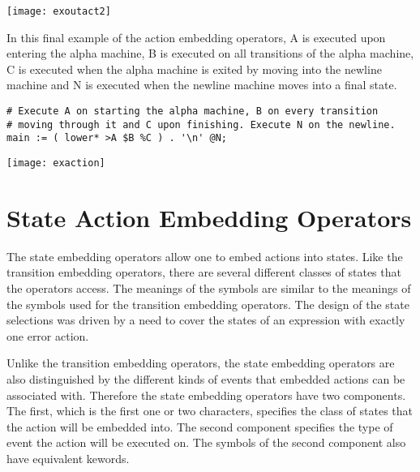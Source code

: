 \documentclass[letterpaper,11pt,oneside]{book}
\newcommand{\graphspace}{\vspace{10pt}}
\newenvironment{inline_code}{\def\baselinestretch{1}\vspace{12pt}\small}{}
\begin{document}
\graphspace
\begin{center}
\texttt{[image: exoutact2]}
\end{center}
\graphspace

In this final example of the action embedding operators, A is executed upon entering
the alpha machine, B is executed on all transitions of the
alpha machine, C is executed when the alpha machine is exited by moving into the
newline machine and N is executed when the newline machine moves into a final
state.  

\begin{inline_code}
\begin{verbatim}
# Execute A on starting the alpha machine, B on every transition 
# moving through it and C upon finishing. Execute N on the newline.
main := ( lower* >A $B %C ) . '\n' @N;
\end{verbatim}
\end{inline_code}

\graphspace
\begin{center}
\texttt{[image: exaction]}
\end{center}
\graphspace


\section{State Action Embedding Operators}

The state embedding operators allow one to embed actions into states. Like the
transition embedding operators, there are several different classes of states
that the operators access. The meanings of the symbols are similar to the
meanings of the symbols used for the transition embedding operators. The design
of the state selections was driven by a need to cover the states of an
expression with exactly one error action.

Unlike the transition embedding operators, the state embedding operators are
also distinguished by the different kinds of events that embedded actions can
be associated with. Therefore the state embedding operators have two
components.  The first, which is the first one or two characters, specifies the
class of states that the action will be embedded into. The second component
specifies the type of event the action will be executed on. The symbols of the
second component also have equivalent kewords. 
\end{document}
